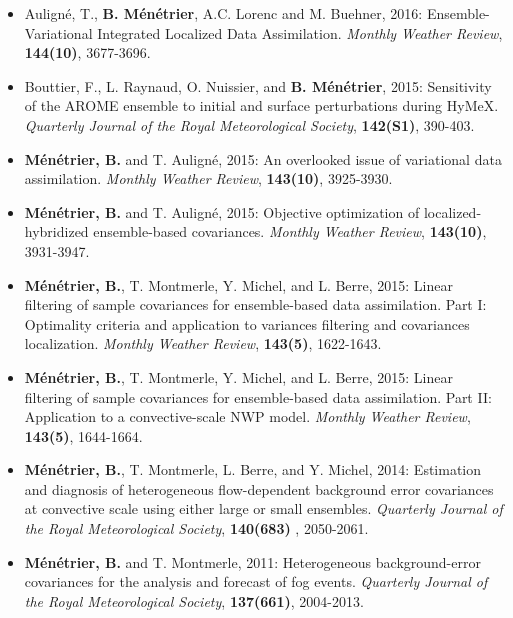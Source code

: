 \documentclass[a4paper,9pt]{scrreprt}
\begin{document}
\begin{itemize}
\item Auligné, T., \textbf{B. Ménétrier}, A.C. Lorenc and M. Buehner, 2016: Ensemble-Variational Integrated Localized Data Assimilation. \textit{Monthly Weather Review}, \textbf{144(10)}, 3677-3696.\vspace{-0.1cm}
\item Bouttier, F., L. Raynaud, O. Nuissier, and \textbf{B. Ménétrier}, 2015: Sensitivity of the AROME ensemble to initial and surface perturbations during HyMeX. \textit{Quarterly Journal of the Royal Meteorological Society}, \textbf{142(S1)}, 390-403.\vspace{-0.1cm}
\item \textbf{Ménétrier, B.} and T. Auligné, 2015: An overlooked issue of variational data assimilation. \textit{Monthly Weather Review}, \textbf{143(10)}, 3925-3930.\vspace{-0.1cm}
\item \textbf{Ménétrier, B.} and T. Auligné, 2015: Objective optimization of localized-hybridized ensemble-based covariances. \textit{Monthly Weather Review}, \textbf{143(10)}, 3931-3947.\vspace{-0.1cm}
\item \textbf{Ménétrier, B.}, T. Montmerle, Y. Michel, and L. Berre, 2015: Linear filtering of sample covariances for ensemble-based data assimilation. Part I: Optimality criteria and application to variances filtering and covariances localization. \textit{Monthly Weather Review}, \textbf{143(5)}, 1622-1643.\vspace{-0.1cm}
\item \textbf{Ménétrier, B.}, T. Montmerle, Y. Michel, and L. Berre, 2015: Linear filtering of sample covariances for ensemble-based data assimilation. Part II: Application to a convective-scale NWP model.  \textit{Monthly Weather Review}, \textbf{143(5)}, 1644-1664.\vspace{-0.1cm}
\item \textbf{Ménétrier, B.}, T. Montmerle, L. Berre, and Y. Michel, 2014: Estimation and diagnosis of heterogeneous flow-dependent background error covariances at convective scale using either large or small ensembles. \textit{Quarterly Journal of the Royal Meteorological Society}, \textbf{140(683)} , 2050-2061.\vspace{-0.1cm}
\item \textbf{Ménétrier, B.} and T. Montmerle, 2011: Heterogeneous background-error covariances for the analysis and forecast of fog events. \textit{Quarterly Journal of the Royal Meteorological Society}, \textbf{137(661)}, 2004-2013.\vspace{-0.1cm}

\end{itemize}
\end{document}
